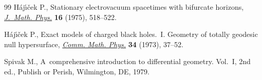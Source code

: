 \documentclass[11pt]{article}
\numberwithin{equation}{section}
\renewcommand{\=}{\stackrel \Lambda =}
\begin{document}
\begin{thebibliography}{99}
H\'aj{\'\i}{\v{c}}ek P., Stationary electrovacuum spacetimes with bifurcate
 horizons, \href{https://doi.org/10.1063/1.522575}{\textit{J.~Math. Phys.}} \textbf{16} (1975), 518--522.

H\'aj\'{\i}\v{c}ek P., Exact models of charged black holes.~{I}. {G}eometry of
 totally geodesic null hypersurface, \href{https://doi.org/10.1007/BF01646541}{\textit{Comm. Math. Phys.}} \textbf{34}
 (1973), 37--52.

Spivak M., A~comprehensive introduction to differential geometry. {V}ol.~{I},
 2nd ed., Publish or Perish, Wilmington, DE, 1979.

\end{thebibliography}
\end{document}

